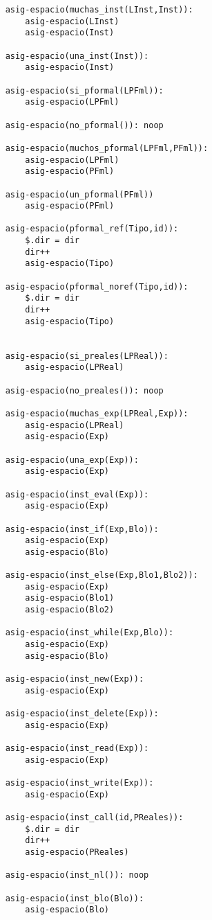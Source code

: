 \begin{lstlisting}
    asig-espacio(muchas_inst(LInst,Inst)):
        asig-espacio(LInst)
        asig-espacio(Inst)

    asig-espacio(una_inst(Inst)):
        asig-espacio(Inst)

    asig-espacio(si_pformal(LPFml)):
        asig-espacio(LPFml)

    asig-espacio(no_pformal()): noop

    asig-espacio(muchos_pformal(LPFml,PFml)):
        asig-espacio(LPFml)
        asig-espacio(PFml)

    asig-espacio(un_pformal(PFml))
        asig-espacio(PFml)

    asig-espacio(pformal_ref(Tipo,id)):
        $.dir = dir
        dir++
        asig-espacio(Tipo)

    asig-espacio(pformal_noref(Tipo,id)):
        $.dir = dir
        dir++
        asig-espacio(Tipo)
        

    asig-espacio(si_preales(LPReal)):
        asig-espacio(LPReal)

    asig-espacio(no_preales()): noop

    asig-espacio(muchas_exp(LPReal,Exp)):
        asig-espacio(LPReal)
        asig-espacio(Exp)

    asig-espacio(una_exp(Exp)):
        asig-espacio(Exp)

    asig-espacio(inst_eval(Exp)):
        asig-espacio(Exp)

    asig-espacio(inst_if(Exp,Blo)):
        asig-espacio(Exp)
        asig-espacio(Blo)

    asig-espacio(inst_else(Exp,Blo1,Blo2)):
        asig-espacio(Exp)
        asig-espacio(Blo1)
        asig-espacio(Blo2)

    asig-espacio(inst_while(Exp,Blo)):
        asig-espacio(Exp)
        asig-espacio(Blo)

    asig-espacio(inst_new(Exp)):
        asig-espacio(Exp)

    asig-espacio(inst_delete(Exp)):
        asig-espacio(Exp)

    asig-espacio(inst_read(Exp)):
        asig-espacio(Exp)

    asig-espacio(inst_write(Exp)):
        asig-espacio(Exp)

    asig-espacio(inst_call(id,PReales)):
        $.dir = dir
        dir++
        asig-espacio(PReales)

    asig-espacio(inst_nl()): noop

    asig-espacio(inst_blo(Blo)):
        asig-espacio(Blo)


\end{lstlisting}
